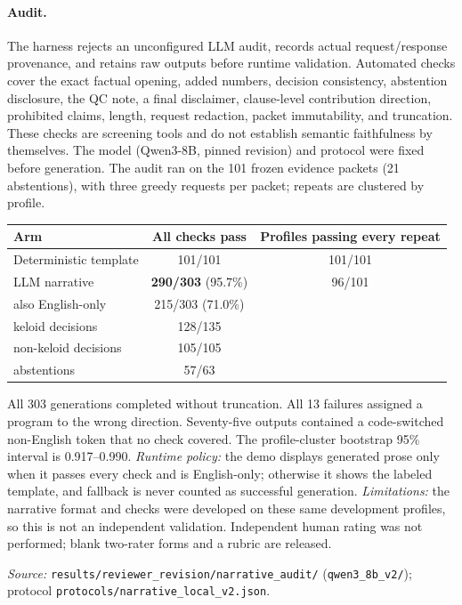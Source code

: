 \paragraph{Audit.} The harness rejects an unconfigured LLM audit, records actual
request/response provenance, and retains raw outputs before runtime validation.
Automated checks cover the exact factual opening, added numbers, decision
consistency, abstention disclosure, the QC note, a final disclaimer,
clause-level contribution direction, prohibited claims, length, request
redaction, packet immutability, and truncation. These checks are screening
tools and do not establish semantic faithfulness by themselves. The model
(Qwen3-8B, pinned revision) and protocol were fixed before generation. The audit
ran on the 101 frozen evidence packets (21 abstentions), with three greedy
requests per packet; repeats are clustered by profile.

{\small
\begin{tabular}{@{}lcc@{}}
\toprule
Arm & All checks pass & Profiles passing every repeat \\
\midrule
Deterministic template & 101/101 & 101/101 \\
LLM narrative & \textbf{290/303} (95.7\%) & 96/101 \\
\quad also English-only & 215/303 (71.0\%) & \\
\midrule
\quad keloid decisions & 128/135 & \\
\quad non-keloid decisions & 105/105 & \\
\quad abstentions & 57/63 & \\
\bottomrule
\end{tabular}
}

\smallskip
All 303 generations completed without truncation. All 13 failures assigned a
program to the wrong direction. Seventy-five outputs contained a code-switched
non-English token that no check covered. The profile-cluster bootstrap 95\%
interval is 0.917--0.990. \emph{Runtime policy:} the demo displays generated
prose only when it passes every check and is English-only; otherwise it shows
the labeled template, and fallback is never counted as successful generation.
\emph{Limitations:} the narrative format and checks were developed on these same
development profiles, so this is not an independent validation. Independent
human rating was not performed; blank two-rater forms and a rubric are released.

\noindent\textit{Source:} \texttt{results/reviewer\_revision/narrative\_audit/}
(\texttt{qwen3\_8b\_v2/}); protocol \texttt{protocols/narrative\_local\_v2.json}.

